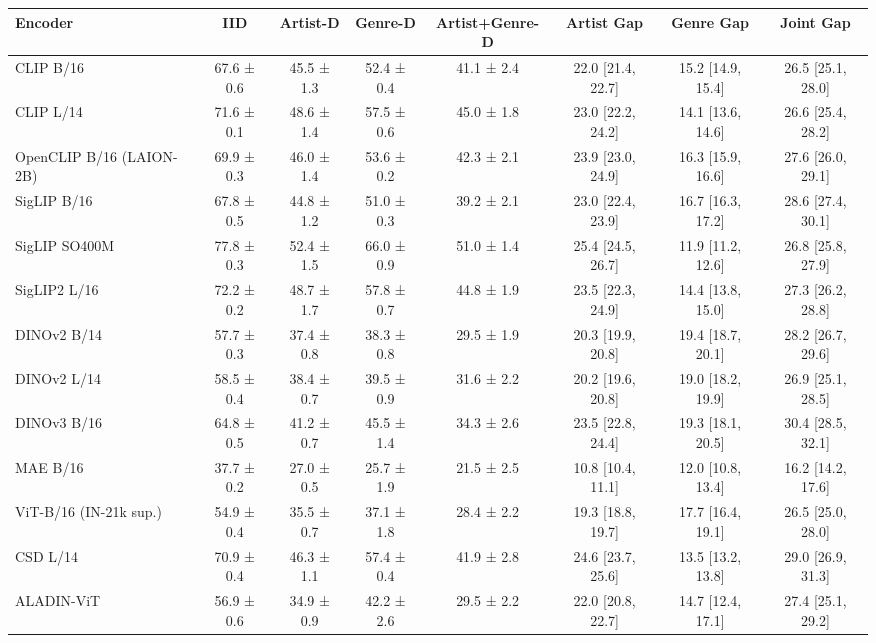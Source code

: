 \begin{tabular}{lccccccc}
\toprule
Encoder & IID & Artist-D & Genre-D & Artist+Genre-D & Artist Gap & Genre Gap & Joint Gap \\
\midrule
CLIP B/16 & 67.6 ± 0.6 & 45.5 ± 1.3 & 52.4 ± 0.4 & 41.1 ± 2.4 & 22.0 [21.4, 22.7] & 15.2 [14.9, 15.4] & 26.5 [25.1, 28.0] \\
CLIP L/14 & 71.6 ± 0.1 & 48.6 ± 1.4 & 57.5 ± 0.6 & 45.0 ± 1.8 & 23.0 [22.2, 24.2] & 14.1 [13.6, 14.6] & 26.6 [25.4, 28.2] \\
OpenCLIP B/16 (LAION-2B) & 69.9 ± 0.3 & 46.0 ± 1.4 & 53.6 ± 0.2 & 42.3 ± 2.1 & 23.9 [23.0, 24.9] & 16.3 [15.9, 16.6] & 27.6 [26.0, 29.1] \\
SigLIP B/16 & 67.8 ± 0.5 & 44.8 ± 1.2 & 51.0 ± 0.3 & 39.2 ± 2.1 & 23.0 [22.4, 23.9] & 16.7 [16.3, 17.2] & 28.6 [27.4, 30.1] \\
SigLIP SO400M & 77.8 ± 0.3 & 52.4 ± 1.5 & 66.0 ± 0.9 & 51.0 ± 1.4 & 25.4 [24.5, 26.7] & 11.9 [11.2, 12.6] & 26.8 [25.8, 27.9] \\
SigLIP2 L/16 & 72.2 ± 0.2 & 48.7 ± 1.7 & 57.8 ± 0.7 & 44.8 ± 1.9 & 23.5 [22.3, 24.9] & 14.4 [13.8, 15.0] & 27.3 [26.2, 28.8] \\
DINOv2 B/14 & 57.7 ± 0.3 & 37.4 ± 0.8 & 38.3 ± 0.8 & 29.5 ± 1.9 & 20.3 [19.9, 20.8] & 19.4 [18.7, 20.1] & 28.2 [26.7, 29.6] \\
DINOv2 L/14 & 58.5 ± 0.4 & 38.4 ± 0.7 & 39.5 ± 0.9 & 31.6 ± 2.2 & 20.2 [19.6, 20.8] & 19.0 [18.2, 19.9] & 26.9 [25.1, 28.5] \\
DINOv3 B/16 & 64.8 ± 0.5 & 41.2 ± 0.7 & 45.5 ± 1.4 & 34.3 ± 2.6 & 23.5 [22.8, 24.4] & 19.3 [18.1, 20.5] & 30.4 [28.5, 32.1] \\
MAE B/16 & 37.7 ± 0.2 & 27.0 ± 0.5 & 25.7 ± 1.9 & 21.5 ± 2.5 & 10.8 [10.4, 11.1] & 12.0 [10.8, 13.4] & 16.2 [14.2, 17.6] \\
ViT-B/16 (IN-21k sup.) & 54.9 ± 0.4 & 35.5 ± 0.7 & 37.1 ± 1.8 & 28.4 ± 2.2 & 19.3 [18.8, 19.7] & 17.7 [16.4, 19.1] & 26.5 [25.0, 28.0] \\
CSD L/14 & 70.9 ± 0.4 & 46.3 ± 1.1 & 57.4 ± 0.4 & 41.9 ± 2.8 & 24.6 [23.7, 25.6] & 13.5 [13.2, 13.8] & 29.0 [26.9, 31.3] \\
ALADIN-ViT & 56.9 ± 0.6 & 34.9 ± 0.9 & 42.2 ± 2.6 & 29.5 ± 2.2 & 22.0 [20.8, 22.7] & 14.7 [12.4, 17.1] & 27.4 [25.1, 29.2] \\
\bottomrule
\end{tabular}

